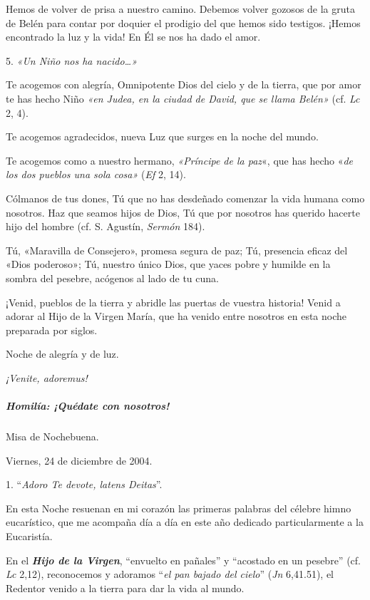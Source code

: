 \documentclass[]{article}
\let\oldsubparagraph\subparagraph
\renewcommand{\subparagraph}[1]{\oldsubparagraph{#1}\mbox{}}
\begin{document}
Hemos de volver de prisa a nuestro camino. Debemos volver gozosos de la
gruta de Belén para contar por doquier el prodigio del que hemos sido
testigos. ¡Hemos encontrado la luz y la vida! En Él se nos ha dado el
amor.

5. \emph{«Un Niño nos ha nacido\ldots{}»}

Te acogemos con alegría, Omnipotente Dios del cielo y de la tierra, que
por amor te has hecho Niño \emph{«en Judea, en la ciudad de David, que
se llama Belén»} (cf. \emph{Lc} 2, 4).

Te acogemos agradecidos, nueva Luz que surges en la noche del mundo.

Te acogemos como a nuestro hermano, \emph{«Príncipe de la paz}«, que has
hecho «\emph{de los dos pueblos una sola cosa»} (\emph{Ef} 2, 14).

Cólmanos de tus dones, Tú que no has desdeñado comenzar la vida humana
como nosotros. Haz que seamos hijos de Dios, Tú que por nosotros has
querido hacerte hijo del hombre (cf. S. Agustín, \emph{Sermón} 184).

Tú, «Maravilla de Consejero», promesa segura de paz; Tú, presencia
eficaz del «Dios poderoso»; Tú, nuestro único Dios, que yaces pobre y
humilde en la sombra del pesebre, acógenos al lado de tu cuna.

¡Venid, pueblos de la tierra y abridle las puertas de vuestra historia!
Venid a adorar al Hijo de la Virgen María, que ha venido entre nosotros
en esta noche preparada por siglos.

Noche de alegría y de luz.

\emph{¡Venite,
adoremus!}\protect\hypertarget{_Toc448662785}{}{\protect\hypertarget{_Toc448690304}{}{\protect\hypertarget{_Toc448708327}{}{\protect\hypertarget{_Toc448709413}{}{\protect\hypertarget{_Toc449554415}{}{}}}}}

\subparagraph{Homilía: ¡Quédate con
nosotros!}\label{homiluxeda-quuxe9date-con-nosotros}

Misa de Nochebuena.

Viernes, 24 de diciembre de 2004.

1. ``\emph{Adoro Te devote, latens Deitas}''.

En esta Noche resuenan en mi corazón las primeras palabras del célebre
himno eucarístico, que me acompaña día a día en este año dedicado
particularmente a la Eucaristía.

En el \emph{\textbf{Hijo de la Virgen}}, ``envuelto en pañales'' y
``acostado en un pesebre'' (cf. \emph{Lc} 2,12), reconocemos y adoramos
``\emph{el pan bajado del cielo}'' (\emph{Jn} 6,41.51), el Redentor
venido a la tierra para dar la vida al mundo.
\end{document}
